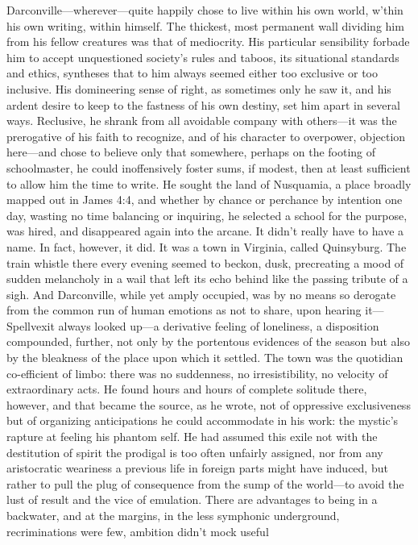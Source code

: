  Darconville—wherever—quite happily chose to live within his own world, w’thin
his own writing, within himself. The thickest, most permanent wall dividing him
from his fellow creatures was that of mediocrity. His particular sensibility
forbade him to accept unquestioned society’s rules and taboos, its situational
standards and ethics, syntheses that to him always seemed either too exclusive
or too inclusive. His domineering sense of right, as sometimes only he saw it,
and his ardent desire to keep to the fastness of his own destiny, set him apart
in several ways. Reclusive, he shrank from all avoidable company with others—it
was the prerogative of his faith to recognize, and of his character to
overpower, objection here—and chose to believe only that somewhere, perhaps on
the footing of schoolmaster, he could inoffensively foster sums, if modest, then
at least sufficient to allow him the time to write. He sought the land of
Nusquamia, a place broadly mapped out in James 4:4, and whether by chance or
perchance by intention one day, wasting no time balancing or inquiring, he
selected a school for the purpose, was hired, and disappeared again into the
arcane. It didn’t really have to have a name. In fact, however, it did. It was a
town in Virginia, called Quinsyburg.
  The train whistle there every evening seemed to beckon, dusk, precreating a
mood of sudden melancholy in a wail that left its echo behind like the passing
tribute of a sigh. And Darconville, while yet amply occupied, was by no means so
derogate from the common run of human emotions as not to share, upon hearing
it—Spellvexit always looked up—a derivative feeling of loneliness, a disposition
compounded, further, not only by the portentous evidences of the season but also
by the bleakness of the place upon which it settled. The town was the quotidian
co-efficient of limbo: there was no suddenness, no irresistibility, no velocity
of extraordinary acts. He found hours and hours of complete solitude there,
however, and that became the source, as he wrote, not of oppressive
exclusiveness but of organizing anticipations he could accommodate in his work:
the mystic’s rapture at feeling his phantom self. He had assumed this exile not
with the destitution of spirit the prodigal is too often unfairly assigned, nor
from any aristocratic weariness a previous life in foreign parts might have
induced, but rather to pull the plug of consequence from the sump of the
world—to avoid the lust of result and the vice of emulation.
  There are advantages to being in a backwater, and at the margins, in the less
symphonic underground, recriminations were few, ambition didn’t mock useful
